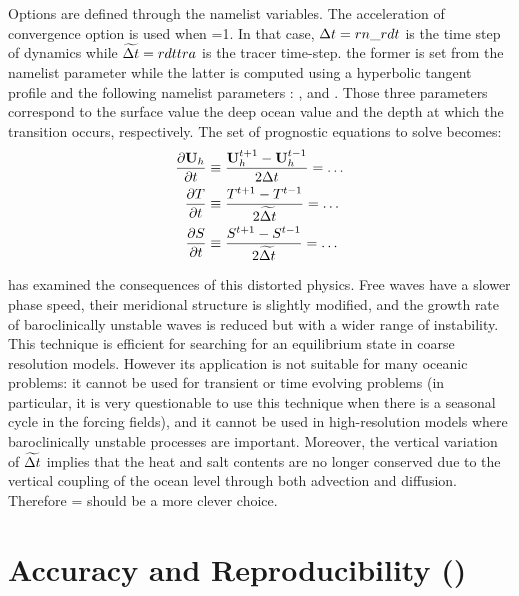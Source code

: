 \documentclass[NEMO_book]{subfiles}
\begin{document}
Options are defined through the   namelist variables.
The acceleration of convergence option is used when =1. In that case, 
$\Delta t=rn\_rdt$ is the time step of dynamics while $\widetilde{\Delta t}=rdttra$ is the 
tracer time-step. the former is set from the  namelist parameter while the latter
is computed using a hyperbolic tangent profile and the following namelist parameters : 
,  and . Those three parameters correspond 
to the surface value the deep ocean value and the depth at which the transition occurs, respectively. 
The set of prognostic equations to solve becomes:
\begin{equation} \label{Eq_acc}
\begin{split}
\frac{\partial \textbf{U}_h }{\partial t} 
	&\equiv \frac{\textbf{U}_h ^{t+1}-\textbf{U}_h^{t-1} }{2\Delta t} = \ldots \\ 
\frac{\partial T}{\partial t} &\equiv \frac{T^{t+1}-T^{t-1}}{2 \widetilde{\Delta t}} = \ldots \\ 
\frac{\partial S}{\partial t} &\equiv \frac{S^{t+1} -S^{t-1}}{2 \widetilde{\Delta t}} = \ldots \\ 
\end{split}
\end{equation}

\citet{Bryan1984} has examined the consequences of this distorted physics. 
Free waves have a slower phase speed, their meridional structure is slightly 
modified, and the growth rate of baroclinically unstable waves is reduced 
but with a wider range of instability. This technique is efficient for 
searching for an equilibrium state in coarse resolution models. However its 
application is not suitable for many oceanic problems: it cannot be used for 
transient or time evolving problems (in particular, it is very questionable 
to use this technique when there is a seasonal cycle in the forcing fields), 
and it cannot be used in high-resolution models where baroclinically 
unstable processes are important. Moreover, the vertical variation of 
$\widetilde{ \Delta t}$ implies that the heat and salt contents are no longer 
conserved due to the vertical coupling of the ocean level through both 
advection and diffusion. Therefore  =  should be
a more clever choice.


\section{Accuracy and Reproducibility ()}
\label{MISC_fortran}
\end{document}
